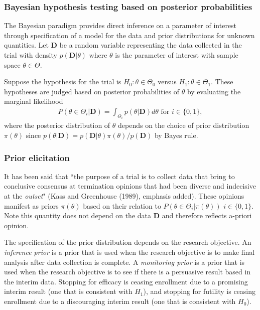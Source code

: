 \documentclass[12pt]{article}
\begin{document}
\subsubsection{Bayesian hypothesis testing based on posterior probabilities}

The Bayesian paradigm provides direct inference on a parameter of interest through specification of a model for the data and prior distributions for unknown quantities. Let $\mathbf{D}$ be a random variable representing the data collected in the trial with density $p(\mathbf{D}|\theta)$ where $\theta$ is the parameter of interest with sample space $\theta\in\Theta$. 

Suppose the hypothesis for the trial is $H_0:\theta\in\Theta_0$ versus $H_1:\theta\in\Theta_1$. These hypotheses are judged based on posterior probabilities of $\theta$ by evaluating the marginal likelihood 
\begin{align}
P(\theta\in\Theta_i|\mathbf{D})=\int_{\Theta_i}p(\theta|\mathbf{D})d\theta\text{ for }i\in\{0,1\},
\end{align}
where the posterior distribution of $\theta$ depends on the choice of prior distribution $\pi(\theta)$ since $p(\theta|\mathbf{D})=p(\mathbf{D}|\theta)\pi(\theta)/p(\mathbf{D})$ by Bayes rule.
\subsubsection{Prior elicitation}
It has been said that ``the purpose of a trial is to collect data that bring to conclusive consensus at termination opinions that had been diverse and indecisive at the \textit{outset}" (Kass and Greenhouse (1989), emphasis added). These opinions manifest as priors $\pi(\theta)$ based on their relation to $P(\theta\in\Theta_i|\pi(\theta))$ $i\in\{0,1\}$. Note this quantity does not depend on the data $\mathbf{D}$ and therefore reflects a-priori opinion.

 The specification of the prior distribution depends on the research objective. An \textit{inference prior} is a prior that is used when the research objective is to make final analysis after data collection is complete. A \textit{monitoring prior} is a prior that is used when the research objective is to see if there is a persuasive result based in the interim data. Stopping for efficacy is ceasing enrollment due to a promising interim result (one that is consistent with $H_1$), and stopping for futility is ceasing enrollment due to a discouraging interim result (one that is consistent with $H_0$).
\end{document}
